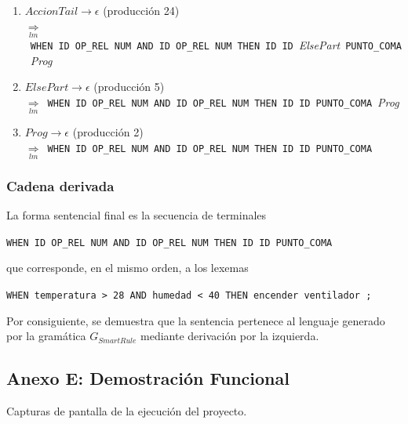 \documentclass[12pt,a4paper]{article}
\begin{document}
{\begin{enumerate}[leftmargin=1.2cm, itemsep=3pt]
$\underset{lm}{\Rightarrow}$\ \texttt{WHEN}\ \texttt{ID}\ \texttt{OP\_REL}\ \texttt{NUM}\ \texttt{AND}\ \texttt{ID}\ \texttt{OP\_REL}\ \texttt{NUM}\ \texttt{THEN}\ \texttt{ID}\ \texttt{ID}\ \textit{AccionTail}\ \textit{ElsePart}\ \texttt{PUNTO\_COMA}\ \textit{Prog}
\item $\mathit{AccionTail} \to \epsilon$ (producción 24)\\
$\underset{lm}{\Rightarrow}$\ \texttt{WHEN}\ \texttt{ID}\ \texttt{OP\_REL}\ \texttt{NUM}\ \texttt{AND}\ \texttt{ID}\ \texttt{OP\_REL}\ \texttt{NUM}\ \texttt{THEN}\ \texttt{ID}\ \texttt{ID}\ \textit{ElsePart}\ \texttt{PUNTO\_COMA}\ \textit{Prog}
\item $\mathit{ElsePart} \to \epsilon$ (producción 5)\\
$\underset{lm}{\Rightarrow}$\ \texttt{WHEN}\ \texttt{ID}\ \texttt{OP\_REL}\ \texttt{NUM}\ \texttt{AND}\ \texttt{ID}\ \texttt{OP\_REL}\ \texttt{NUM}\ \texttt{THEN}\ \texttt{ID}\ \texttt{ID}\ \texttt{PUNTO\_COMA}\ \textit{Prog}
\item $\mathit{Prog} \to \epsilon$ (producción 2)\\
$\underset{lm}{\Rightarrow}$\ \texttt{WHEN}\ \texttt{ID}\ \texttt{OP\_REL}\ \texttt{NUM}\ \texttt{AND}\ \texttt{ID}\ \texttt{OP\_REL}\ \texttt{NUM}\ \texttt{THEN}\ \texttt{ID}\ \texttt{ID}\ \texttt{PUNTO\_COMA}
\end{enumerate}
}

\subsubsection{Cadena derivada}
La forma sentencial final es la secuencia de terminales
\begin{center}
\texttt{WHEN ID OP\_REL NUM AND ID OP\_REL NUM THEN ID ID PUNTO\_COMA}
\end{center}
que corresponde, en el mismo orden, a los lexemas
\begin{center}
\texttt{WHEN temperatura \textgreater{} 28 AND humedad \textless{} 40 THEN encender ventilador ;}
\end{center}
Por consiguiente, se demuestra que la sentencia pertenece al lenguaje generado por la gramática $G_{SmartRule}$ mediante derivación por la izquierda.

\newpage
\subsection{Anexo E: Demostración Funcional}
\label{anexo:demo}
Capturas de pantalla de la ejecución del proyecto.
\end{document}
